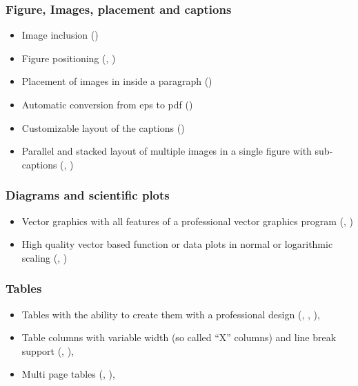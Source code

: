 \subsubsection*{Figure, Images, placement and captions}
\begin{itemize}
%
\item Image inclusion ()
\item Figure positioning (, )
\item Placement of images in inside a paragraph ()
\item Automatic conversion from eps to pdf ()
\item Customizable layout of the captions ()
\item Parallel and stacked layout of multiple images in a single figure with sub-captions (, )
%
\end{itemize}

\subsubsection*{Diagrams and scientific plots}
\begin{itemize}
\item Vector graphics with all features of a professional vector graphics program (, )
%
\item High quality vector based function or data plots in normal or logarithmic scaling (, )
\end{itemize}

\subsubsection*{Tables}
\begin{itemize}
\item Tables with the ability to create them with a professional design (, , ),
%
\item Table columns with variable width (so called \enquote{X} columns) and line break support (, ),
%
\item Multi page tables (, ),
\end{itemize}

